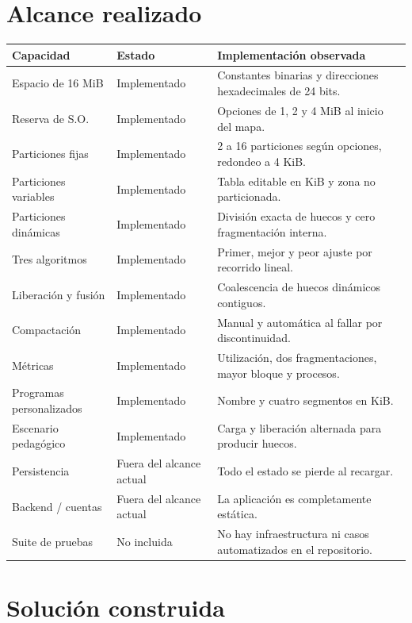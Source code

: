 \documentclass[11pt,a4paper]{article}
\begin{document}
\section{Alcance realizado}

\begin{longtable}{p{}p{}p{}}
\toprule
\textbf{Capacidad} & \textbf{Estado} & \textbf{Implementación observada}\\
\midrule
\endhead
Espacio de 16 MiB & Implementado & Constantes binarias y direcciones hexadecimales de 24 bits.\\
Reserva de S.O. & Implementado & Opciones de 1, 2 y 4 MiB al inicio del mapa.\\
Particiones fijas & Implementado & 2 a 16 particiones según opciones, redondeo a 4 KiB.\\
Particiones variables & Implementado & Tabla editable en KiB y zona no particionada.\\
Particiones dinámicas & Implementado & División exacta de huecos y cero fragmentación interna.\\
Tres algoritmos & Implementado & Primer, mejor y peor ajuste por recorrido lineal.\\
Liberación y fusión & Implementado & Coalescencia de huecos dinámicos contiguos.\\
Compactación & Implementado & Manual y automática al fallar por discontinuidad.\\
Métricas & Implementado & Utilización, dos fragmentaciones, mayor bloque y procesos.\\
Programas personalizados & Implementado & Nombre y cuatro segmentos en KiB.\\
Escenario pedagógico & Implementado & Carga y liberación alternada para producir huecos.\\
Persistencia & Fuera del alcance actual & Todo el estado se pierde al recargar.\\
Backend / cuentas & Fuera del alcance actual & La aplicación es completamente estática.\\
Suite de pruebas & No incluida & No hay infraestructura ni casos automatizados en el repositorio.\\
\bottomrule
\end{longtable}

\section{Solución construida}
\end{document}
